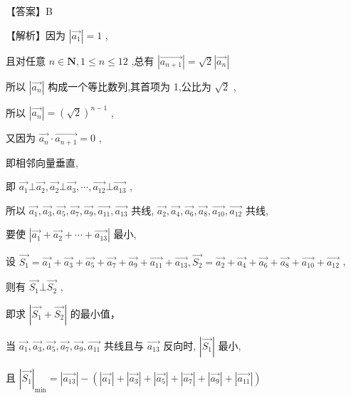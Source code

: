 \documentclass[10pt]{article}
\begin{document}
【答案】B

【解析】因为 \(\left| \overrightarrow{{a}_{1}}\right|  = 1\) ,

且对任意 \(n \in  \mathbf{N},1 \leq  n \leq  {12}\) ,总有 \(\left| \overrightarrow{{a}_{n + 1}}\right|  = \sqrt{2}\left| \overrightarrow{{a}_{n}}\right|\)

所以 \(\left| \overrightarrow{{a}_{n}}\right|\) 构成一个等比数列,其首项为 1,公比为 \(\sqrt{2}\) ,

所以 \(\left| \overrightarrow{{a}_{n}}\right|  = {\left( \sqrt{2}\right) }^{n - 1}\) ,

又因为 \(\overrightarrow{{a}_{n}} \cdot  \overrightarrow{{a}_{n + 1}} = 0\) ,

即相邻向量垂直,

即 \(\overrightarrow{{a}_{1}} \bot  \overrightarrow{{a}_{2}},\overrightarrow{{a}_{2}} \bot  \overrightarrow{{a}_{3}},\cdots ,\overrightarrow{{a}_{12}} \bot  \overrightarrow{{a}_{13}}\) ,

所以 \(\overrightarrow{{a}_{1}},\overrightarrow{{a}_{3}},\overrightarrow{{a}_{5}},\overrightarrow{{a}_{7}},\overrightarrow{{a}_{9}},\overrightarrow{{a}_{11}},\overrightarrow{{a}_{13}}\) 共线, \(\overrightarrow{{a}_{2}},\overrightarrow{{a}_{4}},\overrightarrow{{a}_{6}},\overrightarrow{{a}_{8}},\overrightarrow{{a}_{10}},\overrightarrow{{a}_{12}}\) 共线,

要使 \(\left| {\overrightarrow{{a}_{1}} + \overrightarrow{{a}_{2}} + \cdots  + \overrightarrow{{a}_{13}}}\right|\) 最小,

设 \(\overrightarrow{{S}_{1}} = \overrightarrow{{a}_{1}} + \overrightarrow{{a}_{3}} + \overrightarrow{{a}_{5}} + \overrightarrow{{a}_{7}} + \overrightarrow{{a}_{9}} + \overrightarrow{{a}_{11}} + \overrightarrow{{a}_{13}},\overrightarrow{{S}_{2}} = \overrightarrow{{a}_{2}} + \overrightarrow{{a}_{4}} + \overrightarrow{{a}_{6}} + \overrightarrow{{a}_{8}} + \overrightarrow{{a}_{10}} + \overrightarrow{{a}_{12}}\) ,

则有 \(\overrightarrow{{S}_{1}} \bot  \overrightarrow{{S}_{2}}\) ,

即求 \(\left| {\overrightarrow{{S}_{1}} + \overrightarrow{{S}_{2}}}\right|\) 的最小值，

当 \(\overrightarrow{{a}_{1}},\overrightarrow{{a}_{3}},\overrightarrow{{a}_{5}},\overrightarrow{{a}_{7}},\overrightarrow{{a}_{9}},\overrightarrow{{a}_{11}}\) 共线且与 \(\overrightarrow{{a}_{13}}\) 反向时, \(\left| \overrightarrow{{S}_{1}}\right|\) 最小,

且 \({\left| \overrightarrow{{S}_{1}}\right| }_{\min } = \left| \overrightarrow{{a}_{13}}\right|  - \left( {\left| \overrightarrow{{a}_{1}}\right|  + \left| \overrightarrow{{a}_{3}}\right|  + \left| \overrightarrow{{a}_{5}}\right|  + \left| \overrightarrow{{a}_{7}}\right|  + \left| \overrightarrow{{a}_{9}}\right|  + \left| \overrightarrow{{a}_{11}}\right| }\right)\)
\end{document}

